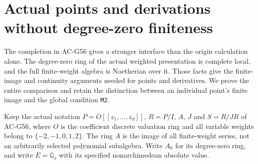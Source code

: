 \section{Actual points and derivations without degree-zero finiteness}
\label{sec:cubic-model-points-without-m2}

The completion in AC-G56 gives a stronger interface than
the origin calculation alone.  The degree-zero ring of
the actual weighted presentation is complete local, and
the full finite-weight algebra is Noetherian over it.
Those facts give the finite-image and continuity
arguments needed for points and derivatives.
We prove the entire comparison and retain the
distinction between an individual point's finite image
and the global condition \texttt{M2}.

Keep the actual notation
$P=O[[z_1,\ldots,z_d]]$, $R=P/I$, $A$, $J$ and
$S=R/JR$ of AC-G56, where $O$ is the coefficient
discrete valuation ring and all variable weights
belong to $\{-2,-1,0,1,2\}$.
The ring $A$ is the image of all finite-weight series,
not an arbitrarily selected polynomial subalgebra.
Write $A_0$ for its degree-zero ring, and write
$\overline E=\overline{\mathbb Q}_\ell$ with its
specified nonarchimedean absolute value.


